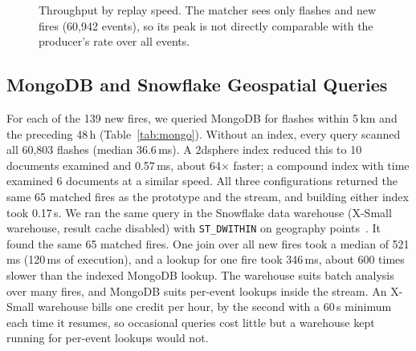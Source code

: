 \documentclass[10pt,journal,compsoc]{IEEEtran}
\begin{document}
\begin{figure}[!t]
\centering
{}
\caption{Throughput by replay speed. The matcher sees only flashes and new fires (60,942 events), so its peak is not directly comparable with the producer's rate over all events.}
\label{fig:bench}
\end{figure}

\subsection{MongoDB and Snowflake Geospatial Queries}
For each of the 139 new fires, we queried MongoDB for flashes within 5\,km and the preceding 48\,h (Table~\ref{tab:mongo}). Without an index, every query scanned all 60,803 flashes (median 36.6\,ms). A 2dsphere index reduced this to 10 documents examined and 0.57\,ms, about 64$\times$ faster; a compound index with time examined 6 documents at a similar speed. All three configurations returned the same 65 matched fires as the prototype and the stream, and building either index took 0.17\,s. We ran the same query in the Snowflake data warehouse (X-Small warehouse, result cache disabled) with \texttt{ST\_DWITHIN} on geography points~\cite{snowflakegeo}. It found the same 65 matched fires. One join over all new fires took a median of 521\,ms (120\,ms of execution), and a lookup for one fire took 346\,ms, about 600 times slower than the indexed MongoDB lookup. The warehouse suits batch analysis over many fires, and MongoDB suits per-event lookups inside the stream. An X-Small warehouse bills one credit per hour, by the second with a 60\,s minimum each time it resumes, so occasional queries cost little but a warehouse kept running for per-event lookups would not.
\end{document}

